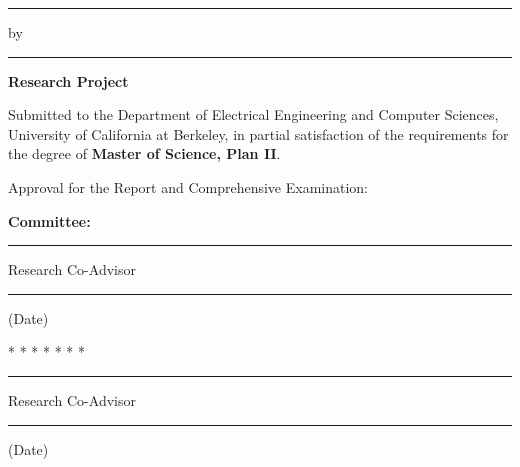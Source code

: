 \makeatletter
\thispagestyle{empty}

\begin{center}
\rule{6.5in}{0.40mm}

\vspace{0.1in}
    {\large \textbf{\@title} }

\vspace{0.1in}
    {\large by \@author }

\vspace{0.1in}
\rule{6.5in}{0.40mm}

\vspace{0.1in}
    {\large {\textbf{Research Project}}}
\end{center}

\noindent Submitted to the Department of Electrical Engineering and
Computer Sciences, University of California at Berkeley,
in partial satisfaction of the requirements for the degree
of \textbf{Master of Science, Plan II}.

\vspace{0.15in}
\noindent Approval for the Report and Comprehensive Examination:

\begin{center}
    \textbf{ Committee:}

\vspace{0.22in}
\rule{3.5in}{0.25mm}

\@chair

Research Co-Advisor

\vspace{0.22in}
\rule{3.5in}{0.25mm}

\vspace{-.1in}
(Date)

\vspace{0.22in}
* * * * * * *

\vspace{0.22in}
\rule{3.5in}{0.25mm}

\@othermembers

Research Co-Advisor

\vspace{0.22in}
\rule{3.5in}{0.25mm}

\vspace{-.1in}
(Date)
\end{center}
\makeatother
